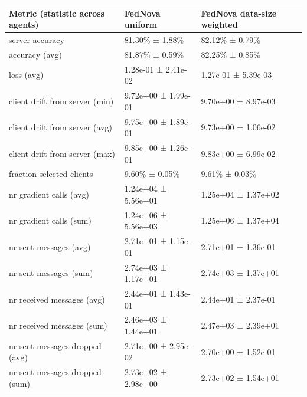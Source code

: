 \begin{tabular}{lll}
\hline
 Metric (statistic across agents)   & FedNova uniform     & FedNova data-size weighted   \\
\hline
 server accuracy                    & 81.30\% ± 1.88\%      & 82.12\% ± 0.79\%               \\
 accuracy (avg)                     & 81.87\% ± 0.59\%      & 82.25\% ± 0.85\%               \\
 loss (avg)                         & 1.28e-01 ± 2.41e-02 & 1.27e-01 ± 5.39e-03          \\
 client drift from server (min)     & 9.72e+00 ± 1.99e-01 & 9.70e+00 ± 8.97e-03          \\
 client drift from server (avg)     & 9.75e+00 ± 1.89e-01 & 9.73e+00 ± 1.06e-02          \\
 client drift from server (max)     & 9.85e+00 ± 1.26e-01 & 9.83e+00 ± 6.99e-02          \\
 fraction selected clients          & 9.60\% ± 0.05\%       & 9.61\% ± 0.03\%                \\
 nr gradient calls (avg)            & 1.24e+04 ± 5.56e+01 & 1.25e+04 ± 1.37e+02          \\
 nr gradient calls (sum)            & 1.24e+06 ± 5.56e+03 & 1.25e+06 ± 1.37e+04          \\
 nr sent messages (avg)             & 2.71e+01 ± 1.15e-01 & 2.71e+01 ± 1.36e-01          \\
 nr sent messages (sum)             & 2.74e+03 ± 1.17e+01 & 2.74e+03 ± 1.37e+01          \\
 nr received messages (avg)         & 2.44e+01 ± 1.43e-01 & 2.44e+01 ± 2.37e-01          \\
 nr received messages (sum)         & 2.46e+03 ± 1.44e+01 & 2.47e+03 ± 2.39e+01          \\
 nr sent messages dropped (avg)     & 2.71e+00 ± 2.95e-02 & 2.70e+00 ± 1.52e-01          \\
 nr sent messages dropped (sum)     & 2.73e+02 ± 2.98e+00 & 2.73e+02 ± 1.54e+01          \\
\hline
\end{tabular}
